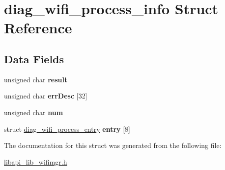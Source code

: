 \hypertarget{structdiag__wifi__process__info}{}\section{diag\+\_\+wifi\+\_\+process\+\_\+info Struct Reference}
\label{structdiag__wifi__process__info}
\subsection*{Data Fields}
\begin{DoxyCompactItemize}
\item 
\mbox{\label{structdiag__wifi__process__info_af82a8e0eabe85fc874156411a105c036}} 
unsigned char {\bfseries result}
\item 
\mbox{\label{structdiag__wifi__process__info_a935785d20f7de6e2c36eed45dd880688}} 
unsigned char {\bfseries err\+Desc} \mbox{[}32\mbox{]}
\item 
\mbox{\label{structdiag__wifi__process__info_a2397fc0e03bbd02caeece36d75b7d380}} 
unsigned char {\bfseries num}
\item 
\mbox{\label{structdiag__wifi__process__info_a851149addd1ac245c589f6a0eb3aba6f}} 
struct \hyperlink{structdiag__wifi__process__entry}{diag\+\_\+wifi\+\_\+process\+\_\+entry} {\bfseries entry} \mbox{[}8\mbox{]}
\end{DoxyCompactItemize}


The documentation for this struct was generated from the following file\+:\begin{DoxyCompactItemize}
\item 
\hyperlink{libapi__lib__wifimgr_8h}{libapi\+\_\+lib\+\_\+wifimgr.\+h}\end{DoxyCompactItemize}
